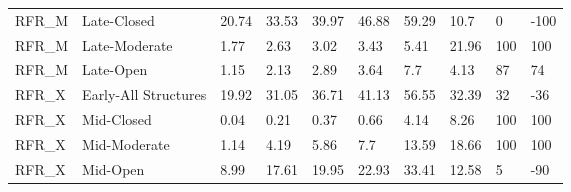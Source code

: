 \begin{sidewaystable}[!htbp]
\begin{tabular}{@{}llllllllll@{}}
\small RFR\_M                   & Late-Closed              & 20.74           & 33.53            & 39.97            & 46.88            & 59.29             & 10.\small 7                                                               & 0                                                                & -\small 100                                                               \\
\small RFR\_M                   & Late-Moderate            & 1.77            & 2.63             & 3.02             & 3.43             & 5.41              & 21.\small 96                                                              & 100                                                              & \small 100                                                                \\
\small RFR\_M                   & Late-Open                & 1.15            & 2.13             & 2.89             & 3.64             & 7.7               & 4.\small 13                                                               & 87                                                               & \small 74                                                                 \\
\small RFR\_X                   & Early-All Structures     & 19.92           & 31.05            & 36.71            & 41.13            & 56.55             & 32.\small 39                                                              & 32                                                               & -\small 36                                                                \\
\small RFR\_X                   & Mid-Closed               & 0.04            & 0.21             & 0.37             & 0.66             & 4.14              & 8.\small 26                                                               & 100                                                              & \small 100                                                                \\
\small RFR\_X                   & Mid-Moderate             & 1.14            & 4.19             & 5.86             & 7.7              & 13.59             & 18.\small 66                                                              & 100                                                              & \small 100                                                                \\
\small RFR\_X                   & Mid-Open                 & 8.99            & 17.61            & 19.95            & 22.93            & 33.41             & 12.\small 58                                                              & 5                                                                & -\small 90                                                                \\

\end{tabular}
\end{sidewaystable}

